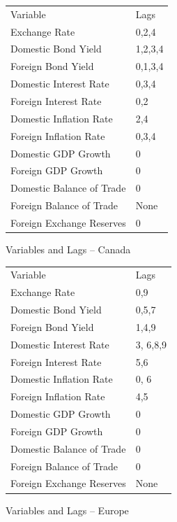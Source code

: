 \documentclass{sig-alternate-05-2015}
\begin{document}
\clearpage

\begin{figure}
\centering
\caption{Variables and Lags -- Canada}
\begin{tabular}{l l}
Variable 					& Lags  \\     
Exchange Rate 				& 0,2,4		\\
Domestic Bond Yield			& 1,2,3,4		\\
Foreign Bond Yield			& 0,1,3,4		\\
Domestic Interest Rate		& 0,3,4		\\
Foreign Interest Rate		& 0,2		\\
Domestic Inflation Rate		& 2,4		\\
Foreign Inflation Rate		& 0,3,4		\\
Domestic GDP Growth			& 0		\\
Foreign GDP Growth			& 0		\\
Domestic Balance of Trade	& 0		\\
Foreign Balance of Trade		& None		\\
Foreign Exchange Reserves	& 0		\\
\end{tabular}
\label{tab:canada_vars}
\end{figure}

\begin{figure}
\centering
\caption{Variables and Lags -- Europe}
\begin{tabular}{l l}
Variable 					& Lags  \\
Exchange Rate 				& 0,9		\\
Domestic Bond Yield			& 0,5,7		\\
Foreign Bond Yield			& 1,4,9		\\
Domestic Interest Rate		& 3,	6,8,9	\\
Foreign Interest Rate		& 5,6		\\
Domestic Inflation Rate		& 0,	6		\\
Foreign Inflation Rate		& 4,5		\\
Domestic GDP Growth			& 0	\\
Foreign GDP Growth			& 0		\\
Domestic Balance of Trade	& 0	\\
Foreign Balance of Trade		& 0	\\
Foreign Exchange Reserves	& None		\\
\end{tabular}
\label{tab:europe_vars}
\end{figure}
\end{document}
